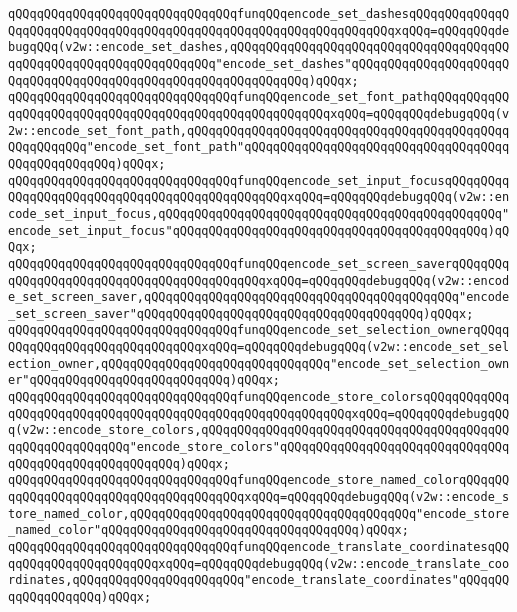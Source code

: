 \verb|qQQqqQQqqQQqqQQqqQQqqQQqqQQqqQQqfunqQQqencode_set_dashesqQQqqQQqqQQqqQQqqQQqqQQqqQQqqQQqqQQqqQQqqQQqqQQqqQQqqQQqqQQqqQQqqQQqxqQQq=qQQqqQQqdebugqQQq(v2w::encode_set_dashes,qQQqqQQqqQQqqQQqqQQqqQQqqQQqqQQqqQQqqQQqqQQqqQQqqQQqqQQqqQQqqQQqqQQq"encode_set_dashes"qQQqqQQqqQQqqQQqqQQqqQQqqQQqqQQqqQQqqQQqqQQqqQQqqQQqqQQqqQQqqQQq)qQQqx;|\newline
\verb|qQQqqQQqqQQqqQQqqQQqqQQqqQQqqQQqfunqQQqencode_set_font_pathqQQqqQQqqQQqqQQqqQQqqQQqqQQqqQQqqQQqqQQqqQQqqQQqqQQqqQQqxqQQq=qQQqqQQqdebugqQQq(v2w::encode_set_font_path,qQQqqQQqqQQqqQQqqQQqqQQqqQQqqQQqqQQqqQQqqQQqqQQqqQQqqQQq"encode_set_font_path"qQQqqQQqqQQqqQQqqQQqqQQqqQQqqQQqqQQqqQQqqQQqqQQqqQQq)qQQqx;|\newline
\verb|qQQqqQQqqQQqqQQqqQQqqQQqqQQqqQQqfunqQQqencode_set_input_focusqQQqqQQqqQQqqQQqqQQqqQQqqQQqqQQqqQQqqQQqqQQqqQQqxqQQq=qQQqqQQqdebugqQQq(v2w::encode_set_input_focus,qQQqqQQqqQQqqQQqqQQqqQQqqQQqqQQqqQQqqQQqqQQqqQQq"encode_set_input_focus"qQQqqQQqqQQqqQQqqQQqqQQqqQQqqQQqqQQqqQQqqQQq)qQQqx;|\newline
\verb|qQQqqQQqqQQqqQQqqQQqqQQqqQQqqQQqfunqQQqencode_set_screen_saverqQQqqQQqqQQqqQQqqQQqqQQqqQQqqQQqqQQqqQQqqQQqxqQQq=qQQqqQQqdebugqQQq(v2w::encode_set_screen_saver,qQQqqQQqqQQqqQQqqQQqqQQqqQQqqQQqqQQqqQQqqQQq"encode_set_screen_saver"qQQqqQQqqQQqqQQqqQQqqQQqqQQqqQQqqQQqqQQq)qQQqx;|\newline
\verb|qQQqqQQqqQQqqQQqqQQqqQQqqQQqqQQqfunqQQqencode_set_selection_ownerqQQqqQQqqQQqqQQqqQQqqQQqqQQqqQQqxqQQq=qQQqqQQqdebugqQQq(v2w::encode_set_selection_owner,qQQqqQQqqQQqqQQqqQQqqQQqqQQqqQQq"encode_set_selection_owner"qQQqqQQqqQQqqQQqqQQqqQQqqQQq)qQQqx;|\newline
\verb|qQQqqQQqqQQqqQQqqQQqqQQqqQQqqQQqfunqQQqencode_store_colorsqQQqqQQqqQQqqQQqqQQqqQQqqQQqqQQqqQQqqQQqqQQqqQQqqQQqqQQqqQQqxqQQq=qQQqqQQqdebugqQQq(v2w::encode_store_colors,qQQqqQQqqQQqqQQqqQQqqQQqqQQqqQQqqQQqqQQqqQQqqQQqqQQqqQQqqQQq"encode_store_colors"qQQqqQQqqQQqqQQqqQQqqQQqqQQqqQQqqQQqqQQqqQQqqQQqqQQqqQQq)qQQqx;|\newline
\verb|qQQqqQQqqQQqqQQqqQQqqQQqqQQqqQQqfunqQQqencode_store_named_colorqQQqqQQqqQQqqQQqqQQqqQQqqQQqqQQqqQQqqQQqxqQQq=qQQqqQQqdebugqQQq(v2w::encode_store_named_color,qQQqqQQqqQQqqQQqqQQqqQQqqQQqqQQqqQQqqQQq"encode_store_named_color"qQQqqQQqqQQqqQQqqQQqqQQqqQQqqQQqqQQq)qQQqx;|\newline
\verb|qQQqqQQqqQQqqQQqqQQqqQQqqQQqqQQqfunqQQqencode_translate_coordinatesqQQqqQQqqQQqqQQqqQQqqQQqxqQQq=qQQqqQQqdebugqQQq(v2w::encode_translate_coordinates,qQQqqQQqqQQqqQQqqQQqqQQq"encode_translate_coordinates"qQQqqQQqqQQqqQQqqQQq)qQQqx;|\newline
